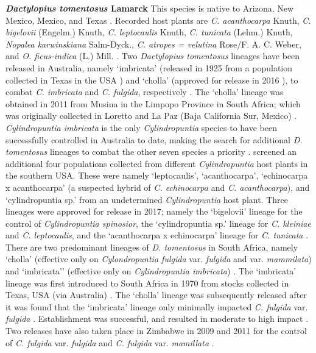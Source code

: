 \noindent \textbf{\textit{Dactylopius tomentosus} Lamarck} \newline 
This species is native to Arizona, New Mexico, Mexico, and Texas \citep{Rodriguez2001}. Recorded host plants are \textit{C. acanthocarpa} Knuth, \textit{C. bigelovii} (Engelm.) Knuth, \textit{C. leptocaulis} Knuth, \textit{C. tunicata} (Lehm.) Knuth, \textit{Nopalea karwinskiana} Salm-Dyck., \textit{C. atropes = velutina} Rose/F. A. C. Weber, and \textit{O. ficus-indica} (L.) Mill. \citep{Mathenge2009, Chavez-Moreno2011DistributionOpuntioideae}. Two \textit{Dactylopius tomentosus} lineages have been released in Australia, namely `imbricata' (released in 1925 from a population collected in Texas in the USA \citep{Winston2014BiologicalWeeds.}) and `cholla' (approved for release in 2016 \citep{managingOpuntioid2017}), to combat \textit{C. imbricata} and \textit{C. fulgida}, respectively \citep{jones2016releasestrat}. The `cholla' lineage was obtained in 2011 from Musina in the Limpopo Province in South Africa; which was originally collected in Loretto and La Paz (Baja California Sur, Mexico) \citep{DayReleaseApp2015}.
\textit{Cylindropuntia imbricata} is the only \textit{Cylindropuntia} species to have been successfully controlled in Australia to date, making the search for additional \textit{D. tomentosus} lineages to combat the other seven species a priority \citep{Jones2015, jones2016releasestrat, jones2016host}. \citet{jones2016host} screened an additional four populations collected from different \textit{Cylindropuntia} host plants in the southern USA. These were namely `leptocaulis', `acanthocarpa', `echinocarpa x acanthocarpa' (a suspected hybrid of \textit{C. echinocarpa} and \textit{C. acanthocarpa}), and `cylindropuntia sp.' from an undetermined \textit{Cylindropuntia} host plant. Three lineages were approved for release in 2017; namely the `bigelovii' lineage for the control of \textit{Cylindropuntia spinosior}, the `cylindropuntia sp.' lineage for \textit{C. kleiniae} and \textit{C. leptocaulis}, and the `acanthocarpa x echinocarpa' lineage for \textit{C. tunicata} \citep{managingOpuntioid2017}. \\
There are two predominant lineages of \textit{D. tomentosus} in South Africa, namely `cholla' (effective only on \textit{Cylondropuntia fulgida} var. \textit{fulgida} and var. \textit{mammilata}) and `imbricata'' (effective only on \textit{Cylindropuntia imbricata}) \citep{Mathenge2010}. The `imbricata' lineage was first introduced to South Africa in 1970 from stocks collected in Texas, USA (via Australia) \citep{Moran1991a}. The `cholla' lineage was subsequently released after it was found that the `imbricata' lineage only minimally impacted \textit{C. fulgida} var. \textit{fulgida} \citep{Moran1991BiologicalAfrica}. Establishment was successful, and resulted in moderate to high impact \citep{Winston2014BiologicalWeeds.}. Two releases have also taken place in Zimbabwe in 2009 and 2011 for the control of \textit{C. fulgida} var. \textit{fulgida} and \textit{C. fulgida} var. \textit{mamillata} \citep{Winston2014BiologicalWeeds.}. \newline
